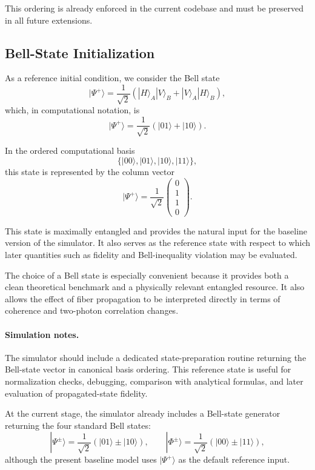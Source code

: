 \documentclass[a4paper]{article}
\begin{document}
This ordering is already enforced in the current codebase and must be preserved in all future extensions.


\subsection{Bell-State Initialization}

As a reference initial condition, we consider the Bell state
\[
|\Psi^{+}\rangle
=
\frac{1}{\sqrt{2}}
\left(
|H\rangle_A |V\rangle_B
+
|V\rangle_A |H\rangle_B
\right),
\]
which, in computational notation, is
\[
|\Psi^{+}\rangle
=
\frac{1}{\sqrt{2}}
\left(
|01\rangle + |10\rangle
\right).
\]

In the ordered computational basis
\[
\{|00\rangle, |01\rangle, |10\rangle, |11\rangle\},
\]
this state is represented by the column vector
\[
|\Psi^{+}\rangle
=
\frac{1}{\sqrt{2}}
\begin{pmatrix}
0\\
1\\
1\\
0
\end{pmatrix}.
\]

This state is maximally entangled and provides the natural input for the baseline version of the simulator. It also serves as the reference state with respect to which later quantities such as fidelity and Bell-inequality violation may be evaluated.

The choice of a Bell state is especially convenient because it provides both a clean theoretical benchmark and a physically relevant entangled resource. It also allows the effect of fiber propagation to be interpreted directly in terms of coherence and two-photon correlation changes.

\paragraph{Simulation notes.}
The simulator should include a dedicated state-preparation routine returning the Bell-state vector in canonical basis ordering. This reference state is useful for normalization checks, debugging, comparison with analytical formulas, and later evaluation of propagated-state fidelity.

At the current stage, the simulator already includes a Bell-state generator returning the four standard Bell states:
\[
|\Psi^{\pm}\rangle
=
\frac{1}{\sqrt{2}}\left(|01\rangle \pm |10\rangle\right),
\qquad
|\Phi^{\pm}\rangle
=
\frac{1}{\sqrt{2}}\left(|00\rangle \pm |11\rangle\right),
\]
although the present baseline model uses \( |\Psi^+\rangle \) as the default reference input.
\end{document}
